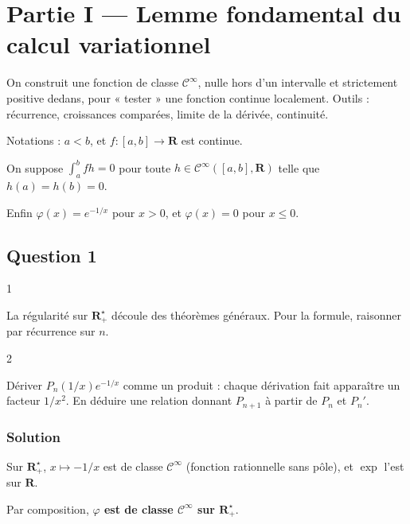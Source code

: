 \documentclass[11pt,a4paper]{article}
\begin{document}
\hypertarget{partie-i-lemme-fondamental-du-calcul-variationnel}{%
\section{Partie I --- Lemme fondamental du calcul variationnel}\label{partie-i-lemme-fondamental-du-calcul-variationnel}}

On construit une fonction de classe \(\mathcal C^\infty\), nulle hors d'un intervalle et strictement positive dedans, pour « tester » une fonction continue localement. Outils : récurrence, croissances comparées, limite de la dérivée, continuité.

Notations : \(a<b\), et \(f:[a,b]\to\mathbf R\) est continue.

On suppose \(\int_a^bfh=0\) pour toute \(h\in\mathcal C^\infty([a,b],\mathbf R)\) telle que \(h(a)=h(b)=0\).

Enfin \(\varphi(x)=e^{-1/x}\) pour \(x>0\), et \(\varphi(x)=0\) pour \(x\le0\).

\hypertarget{question-1}{%
\subsection{Question 1}\label{question-1}}

\begin{indication}{1}

La régularité sur \(\mathbf R_+^\star\) découle des théorèmes généraux. Pour la formule, raisonner par récurrence sur \(n\).

\end{indication}

\begin{indication}{2}

Dériver \(P_n(1/x)e^{-1/x}\) comme un produit : chaque dérivation fait apparaître un facteur \(1/x^2\). En déduire une relation donnant \(P_{n+1}\) à partir de \(P_n\) et \(P_n'\).

\end{indication}

\hypertarget{solution}{%
\subsubsection{Solution}\label{solution}}

Sur \(\mathbf R_+^\star\), \(x\mapsto-1/x\) est de classe \(\mathcal C^\infty\) (fonction rationnelle sans pôle), et \(\exp\) l'est sur \(\mathbf R\).

Par composition, \textbf{\(\varphi\) est de classe \(\mathcal C^\infty\) sur \(\mathbf R_+^\star\)}.
\end{document}

